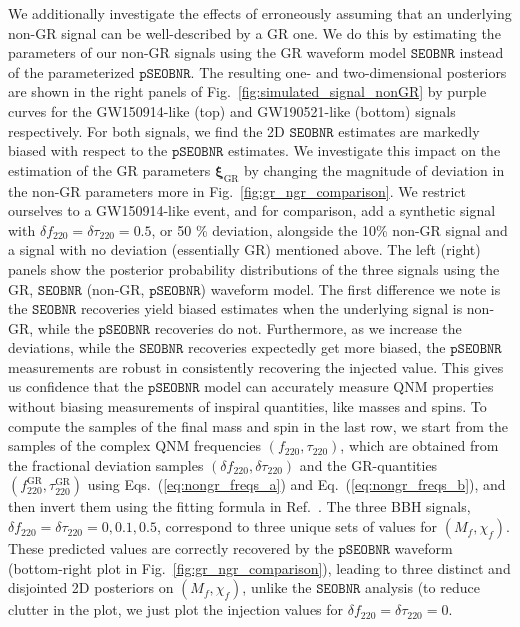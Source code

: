 \documentclass[twocolumn,prd,aps,superscriptaddress,preprintnumbers,tightenlines,showpacs,nofootinbib,eqsecnum,amsfonts,amsmath]{revtex4-1}
\newcommand{\bxigr}{\bm{\xi}_{\text{GR}}}
\newcommand{\df}[1]{\delta f_{\text{#1}}}
\newcommand{\dtau}[1]{\delta \tau_{\text{#1}}}
\newcommand{\fngr}[1]{f_{\text{#1}}}
\newcommand{\taungr}[1]{\tau_{\text{#1}}}
\newcommand{\fgr}[1]{f ^{\text{GR}}_{\text{#1}}}
\newcommand{\taugr}[1]{\tau ^{\text{GR}}_{\text{#1}}}
\newcommand{\pSEOB}{\texttt{pSEOBNR}}
\newcommand{\SEOB}{\texttt{SEOBNR}}
\begin{document}
We additionally investigate the effects of erroneously assuming that
an underlying non-GR signal can be well-described by a GR one. We do
this by estimating the parameters of our non-GR signals using the GR
waveform model $\SEOB$ instead of the parameterized $\pSEOB$.  The
resulting one- and two-dimensional posteriors are shown in the right
panels of Fig.~\ref{fig:simulated_signal_nonGR} by purple curves for the
GW150914-like (top) and GW190521-like (bottom) signals
respectively. For both signals, we find the 2D $\SEOB$ estimates are
markedly biased with respect to the $\pSEOB$ estimates.  We investigate 
this impact on the estimation of the GR parameters $\bxigr$ by changing the
magnitude of deviation in the non-GR parameters more in Fig.~\ref{fig:gr_ngr_comparison}. We restrict ourselves 
to a GW150914-like event, and for comparison, add a synthetic signal
with $\df{220} = \dtau{220} = 0.5$, or 50 \% deviation, alongside the
10\% non-GR signal and a signal with no deviation (essentially GR)
mentioned above. The left (right) panels show the
posterior probability distributions of the three signals using the GR,
$\SEOB$ (non-GR, $\pSEOB$) waveform model. The first difference we
note is the $\SEOB$ recoveries yield biased estimates when the
underlying signal is non-GR, while the $\pSEOB$ recoveries do
not. Furthermore, as we increase the deviations, while the $\SEOB$
recoveries expectedly get more biased, the $\pSEOB$ measurements are
robust in consistently recovering the injected value. This gives us 
confidence that the $\pSEOB$ model can accurately measure QNM 
properties without biasing measurements of inspiral quantities, like masses and spins.
To compute the samples of the final mass and spin in the last row, we start from the samples
of the complex QNM frequencies $(\fngr{220}, \taungr{220})$, which are obtained from the 
fractional deviation samples $(\df{220},\dtau{220})$ and the GR-quantities
$(\fgr{220},\taugr{220})$ using Eqs.~(\ref{eq:nongr_freqs_a}) and Eq.~(\ref{eq:nongr_freqs_b}),
and then invert them using the fitting formula in Ref.~\cite{Berti:2005ys}.
The three BBH signals, $\df{220} = \dtau{220} = 0, 0.1, 0.5$, correspond to
three unique sets of values for $(M_f,\chi_f)$. These predicted values are correctly 
recovered by the $\pSEOB$ waveform (bottom-right plot in Fig.~\ref{fig:gr_ngr_comparison}),
leading to three distinct and disjointed 2D posteriors on $(M_f,\chi_f)$, unlike the $\SEOB$
analysis (to reduce clutter in the plot, we just plot the injection values for $\df{220} = \dtau{220} = 0$. 
\end{document}

